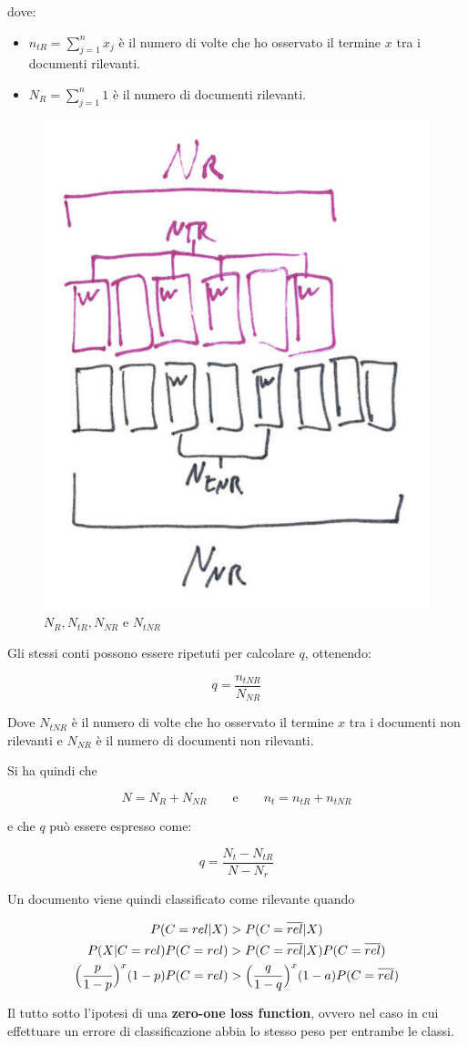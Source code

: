 \noindent dove:
\begin{itemize}
	\item $n_{tR} = \sum\limits_{j = 1}^n x_j$ è il numero di volte che ho osservato il termine $x$ tra i documenti rilevanti.
	\item $N_R = \sum\limits_{j = 1}^n 1$ è il numero di documenti rilevanti.
\end{itemize}

\begin{figure}[htbp]
	\centering
	\includegraphics[width=.35\textwidth]{images/l10-fig-1}
	\caption{$N_R, N_{tR}, N_{NR}$ e $N_{tNR}$}
\end{figure}

Gli stessi conti possono essere ripetuti per calcolare $q$, ottenendo:

$$
\boxed{q = \frac{n_{tNR}}{N_{NR}}}
$$

\noindent Dove $N_{tNR}$ è il numero di volte che ho osservato il termine $x$ tra i documenti non rilevanti e $N_{NR}$ è il numero di documenti non rilevanti.

Si ha quindi che 

$$
N = N_R + N_{NR} \qquad \text{e} \qquad n_t = n_{tR} + n_{tNR}
$$

e che $q$ può essere espresso come:

$$
q = \frac{N_t - N_{tR}}{N - N_r}
$$

Un documento viene quindi classificato come rilevante quando

\begin{align*}
	P(C = rel | X) &> P(C = \overline{rel} | X)\\
	P(X | C=rel)P(C=rel) &> P(C = \overline{rel} |X)P(C = \overline{rel}) \\
	\Big( \frac{p}{1-p} \Big)^x(1-p) P(C = rel) &> \Big(\frac{q}{1-q}\Big)^x (1-a)P(C = \overline{rel})
\end{align*}

Il tutto sotto l'ipotesi di una \textbf{zero-one loss function}, ovvero nel caso in cui effettuare un errore di classificazione abbia lo stesso peso per entrambe le classi.

